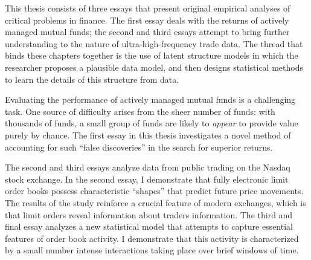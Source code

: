 This thesis consists of three essays that present original empirical analyses of critical problems in finance. The first essay deals with the returns of actively managed mutual funds; the second and third essays attempt to bring further understanding to the nature of ultra-high-frequency trade data. The thread that binds these chapters together is the use of latent structure models in which the researcher proposes a plausible data model, and then designs statistical methods to learn the details of this structure from data.

Evaluating the performance of actively managed mutual funds is a challenging task. One source of difficulty arises from the sheer number of funds: with thousands of funds, a small group of funds are likely to \textit{appear} to provide value purely by chance. The first essay in this thesis investigates a novel method of accounting for such ``false discoveries'' in the search for superior returns.

The second and third essays analyze data from public trading on the Nasdaq stock exchange. In the second essay, I demonstrate that fully electronic limit order books possess characteristic ``shapes'' that predict future price movements. The results of the study reinforce a crucial feature of modern exchanges, which is that limit orders reveal information about traders information. The third and final essay analyzes a new statistical model that attempts to capture essential features of order book activity. I demonstrate that this activity is characterized by a small number intense interactions taking place over brief windows of time.
